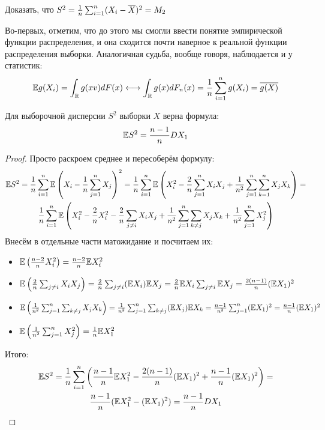 \begin{exercise}
	Доказать, что $S^2 = \frac{1}{n} \sum_{i = 1}^n (X_i - \overline{X})^2 = M_2$
\end{exercise}

\begin{note}
	Во-первых, отметим, что до этого мы смогли ввести понятие эмпирической функции распределения, и она сходится почти наверное к реальной функции распределения выборки. Аналогичная судьба, вообще говоря, наблюдается и у статистик:
	\[
		\mathbb{E} g(X_i) = \int_{\mathbb{R}} g(xv)dF(x) \longleftrightarrow \int_{\mathbb{R}} g(x)dF_n(x) = \frac{1}{n} \sum_{i = 1}^n g(X_i) = \overline{g(X)}
	\]
\end{note}

\begin{proposition}
	Для выборочной дисперсии $S^2$ выборки $X$ верна формула:
	\[
		\mathbb{E} S^2 = \frac{n - 1}{n} DX_1
	\]
\end{proposition}

\begin{proof}
	Просто раскроем среднее и пересоберём формулу:
	\begin{multline*}
		\mathbb{E} S^2 = \frac{1}{n} \sum_{i = 1}^n \mathbb{E}\left(X_i - \frac{1}{n}\sum_{j = 1}^n X_j\right)^2 = \frac{1}{n} \sum_{i = 1}^n \mathbb{E}\left(X_i^2 - \frac{2}{n}\sum_{j = 1}^n X_iX_j + \frac{1}{n^2}\sum_{j = 1}^n \sum_{k = 1}^n X_jX_k\right) =
		\\
		\frac{1}{n} \sum_{i = 1}^n \mathbb{E}\left(X_i^2 - \frac{2}{n}X_i^2 - \frac{2}{n} \sum_{j \neq i} X_iX_j + \frac{1}{n^2} \sum_{j = 1}^n \sum_{k \neq j} X_jX_k + \frac{1}{n^2} \sum_{j = 1}^n X_j^2\right)
	\end{multline*}
	Внесём в отдельные части матожидание и посчитаем их:
	\begin{itemize}
		\item $\mathbb{E}\left(\frac{n - 2}{n}X_i^2\right) = \frac{n - 2}{n}\mathbb{E} X_i^2$
		
		\item $\mathbb{E}\left(\frac{2}{n}\sum_{j \neq i} X_iX_j\right) = \frac{2}{n}\sum_{j \neq i} (\mathbb{E} X_i)\mathbb{E} X_j = \frac{2}{n} \mathbb{E} X_i \sum_{j \neq i} \mathbb{E} X_j = \frac{2(n - 1)}{n} (\mathbb{E} X_1)^2$
		
		\item $\mathbb{E}\left(\frac{1}{n^2} \sum_{j = 1}^n \sum_{k \neq j} X_jX_k\right) = \frac{1}{n^2} \sum_{j = 1}^n \sum_{k \neq j} (\mathbb{E} X_j)\mathbb{E} X_k = \frac{n - 1}{n^2} \sum_{j = 1}^n (\mathbb{E} X_1)^2 = \frac{n - 1}{n} (\mathbb{E} X_1)^2$
		
		\item $\mathbb{E}\left(\frac{1}{n^2} \sum_{j = 1}^n X_j^2\right) = \frac{1}{n} \mathbb{E} X_1^2$
	\end{itemize}
	Итого:
	\begin{multline*}
		\mathbb{E} S^2 = \frac{1}{n} \sum_{i = 1}^n \left(\frac{n - 1}n \mathbb{E} X_1^2 - \frac{2(n - 1)}{n}(\mathbb{E} X_1)^2 + \frac{n - 1}{n}(\mathbb{E} X_1)^2\right) =
		\\
		\frac{n - 1}{n} (\mathbb{E} X_1^2 - (\mathbb{E} X_1)^2) = \frac{n - 1}{n} DX_1
	\end{multline*}
\end{proof}

